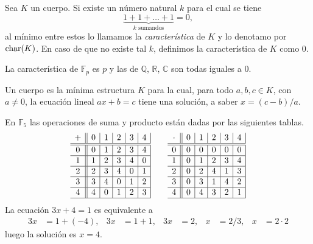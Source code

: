 \begin{defn}
Sea $K$ un cuerpo. Si existe un n\'umero natural $k$ para el cual se tiene
\[
\underbrace{1+1+\ldots+1}_{k \textrm{ sumandos}}=0,
\]
al m\'inimo entre estos lo llamamos la \emph{caracter\'istica} de $K$ y lo denotamo por $\operatorname{char}(K)$. En caso de que no existe tal $k$, definimos la caracter\'istica de $K$ como $0$.   
\end{defn}

\begin{ejem}
La caracter\'istica de $\mathbb{F}_p$ es $p$ y las de $\mathbb{Q}$, $\mathbb{R}$, $\mathbb{C}$ son todas iguales a $0$.
\end{ejem}

\begin{obs}
Un cuerpo es la m\'inima estructura $K$ para la cual, para todo $a,b,c\in K$, con $a\ne 0$, la ecuaci\'on lineal $ax+b=c$ tiene una soluci\'on, a saber $x=(c-b)/a$.
\end{obs}

\begin{ejem}
En $\mathbb{F}_5$ las operaciones de suma y producto est\'an dadas por las siguientes tablas.
{\small
$$\begin{array}{c||c|c|c|c|c|}
+ & 0 & 1 & 2 & 3 & 4\\
\hline
\hline
0 & 0 & 1 & 2 & 3 & 4\\
\hline
1 & 1 & 2 & 3 & 4 & 0\\
\hline 
2 & 2 & 3 & 4 & 0 & 1\\
\hline 
3 & 3 & 4 & 0 & 1 & 2\\
\hline 
4 & 4 & 0 & 1 & 2 & 3\\
\hline 
\end{array} \qquad
\begin{array}{c||c|c|c|c|c|}
\cdot & 0 & 1 & 2 & 3 & 4\\
\hline
\hline
0 & 0 & 0 & 0 & 0 & 0\\
\hline
1 & 0 & 1 & 2 & 3 & 4\\
\hline 
2 & 0 & 2 & 4 & 1 & 3\\
\hline 
3 & 0 & 3 & 1 & 4 & 2\\
\hline 
4 & 0 & 4 & 3 & 2 & 1\\
\hline 
\end{array}$$}
La ecuaci\'on $3x+4=1$ es equivalente a
\begin{align*}
3x & = 1+(-4), & 3x & = 1+1, & 3x & = 2, & x & = 2/3, & x & = 2\cdot 2
\end{align*}
luego la soluci\'on es $x=4$.
\end{ejem}

